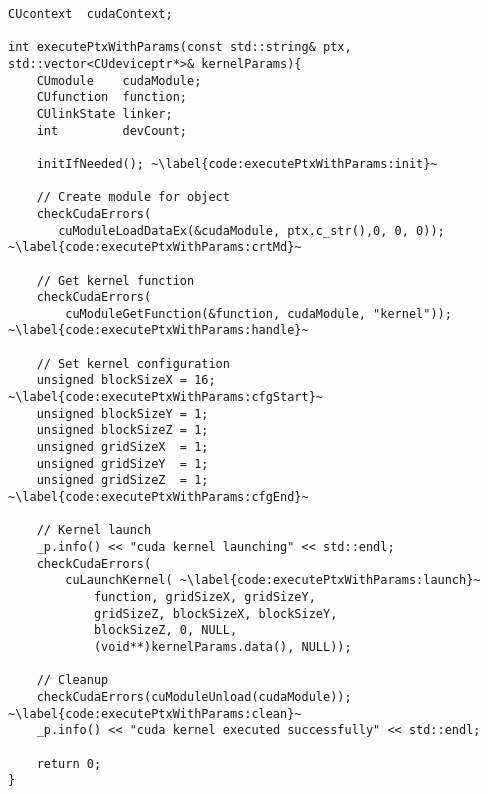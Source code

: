 \begin{lstlisting}[caption={int executePtxWithParams()}, label={code:executePtxWithParams}]
CUcontext  cudaContext;

int executePtxWithParams(const std::string& ptx, std::vector<CUdeviceptr*>& kernelParams){
    CUmodule    cudaModule;
    CUfunction  function;
    CUlinkState linker;
    int         devCount;

    initIfNeeded(); ~\label{code:executePtxWithParams:init}~

    // Create module for object
    checkCudaErrors(
       cuModuleLoadDataEx(&cudaModule, ptx.c_str(),0, 0, 0)); ~\label{code:executePtxWithParams:crtMd}~

    // Get kernel function
    checkCudaErrors(
        cuModuleGetFunction(&function, cudaModule, "kernel")); ~\label{code:executePtxWithParams:handle}~

    // Set kernel configuration
    unsigned blockSizeX = 16;  ~\label{code:executePtxWithParams:cfgStart}~
    unsigned blockSizeY = 1;
    unsigned blockSizeZ = 1;
    unsigned gridSizeX  = 1;
    unsigned gridSizeY  = 1;
    unsigned gridSizeZ  = 1; ~\label{code:executePtxWithParams:cfgEnd}~

    // Kernel launch
    _p.info() << "cuda kernel launching" << std::endl;
    checkCudaErrors(
        cuLaunchKernel( ~\label{code:executePtxWithParams:launch}~
            function, gridSizeX, gridSizeY,
            gridSizeZ, blockSizeX, blockSizeY,
            blockSizeZ, 0, NULL, 
            (void**)kernelParams.data(), NULL));

    // Cleanup
    checkCudaErrors(cuModuleUnload(cudaModule)); ~\label{code:executePtxWithParams:clean}~
    _p.info() << "cuda kernel executed successfully" << std::endl;

    return 0;
}
\end{lstlisting}